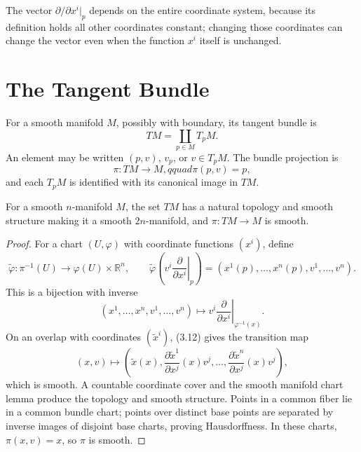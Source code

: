 \begin{remark}
\label{rem:3-15-extra-5}



The vector $\partial/\partial x^i|_p$ depends on the entire coordinate system,
because its definition holds all other coordinates constant; changing those
coordinates can change the vector even when the function $x^i$ itself is
unchanged.
\end{remark}



\section{The Tangent Bundle}

\begin{definition}
\label{def:3-16-extra-1}



For a smooth manifold $M$, possibly with boundary, its tangent bundle is
\[
TM=\coprod_{p\in M}T_pM.
\]
An element may be written $(p,v)$, $v_p$, or $v\in T_pM$. The bundle
projection is
\[
\pi:TM\to M,qquad \pi(p,v)=p,
\]
and each $T_pM$ is identified with its canonical image in $TM$.
\end{definition}

\begin{proposition}
\label{prop:3-18}




For a smooth $n$-manifold $M$, the set $TM$ has a natural topology and smooth
structure making it a smooth $2n$-manifold, and $\pi:TM\to M$ is smooth.
\end{proposition}

\begin{proof}
\sketch
For a chart $(U,\varphi)$ with coordinate functions $(x^i)$, define
\[
\widetilde\varphi:\pi^{-1}(U)\to\varphi(U)\times\mathbb{R}^n,
\qquad
\widetilde\varphi
\left(\left.v^i\frac{\partial}{\partial x^i}\right|_p\right)
=(x^1(p),\ldots,x^n(p),v^1,\ldots,v^n). \tag{3.13}
\]
This is a bijection with inverse
\[
(x^1,\ldots,x^n,v^1,\ldots,v^n)
\longmapsto
\left.v^i\frac{\partial}{\partial x^i}\right|_{\varphi^{-1}(x)}.
\]
On an overlap with coordinates $(\widetilde x^i)$, (3.12) gives the transition
map
\[
(x,v)\longmapsto
\left(\widetilde x(x),
\frac{\partial\widetilde x^1}{\partial x^j}(x)v^j,\ldots,
\frac{\partial\widetilde x^n}{\partial x^j}(x)v^j\right),
\]
which is smooth. A countable coordinate cover and the smooth manifold chart
lemma produce the topology and smooth structure. Points in a common fiber lie
in a common bundle chart; points over distinct base points are separated by
inverse images of disjoint base charts, proving Hausdorffness. In these charts,
$\pi(x,v)=x$, so $\pi$ is smooth.
\end{proof}

